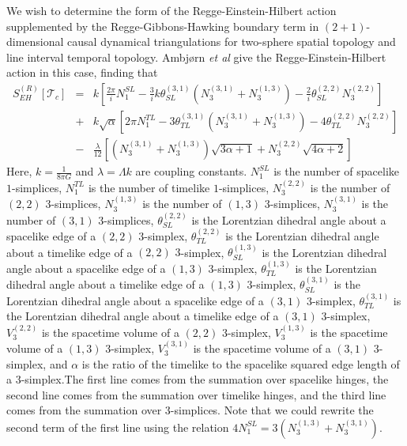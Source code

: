 \documentclass{article}
\begin{document}
We wish to determine the form of the Regge-Einstein-Hilbert action
supplemented by the Regge-Gibbons-Hawking boundary term in
$(2+1)$-dimensional causal dynamical triangulations for two-sphere
spatial topology and line interval temporal topology. Ambj\o rn
\emph{et al} \cite{DynamicallyTriangulating} give the Regge-Einstein-Hilbert action in this case,
finding that
\begin{eqnarray}
S_{EH}^{(R)}[\mathcal{T}_{c}]&=& k\left[\frac{2\pi}{i}N_1^{SL} - \frac{3}{i}k\theta_{SL}^{(3,1)}\left(N_3^{(3,1)} + N_3^{(1,3)}\right) - \frac{2}{i}\theta_{SL}^{(2,2)}N_3^{(2,2)}\right]\\
&+& k\sqrt{\alpha}\left[2\pi N_1^{TL} - 3\theta_{TL}^{(3,1)}(N_3^{(3,1)}+N_3^{(1,3)})-4\theta_{TL}^{(2,2)}N_3^{(2,2)}\right]\nonumber\\
&-& \frac{\lambda}{12}\left[(N_3^{(3,1)}+N_3^{(1,3)})\sqrt{3\alpha+1} + N_3^{(2,2)}\sqrt{4\alpha+2}\right]\nonumber
\end{eqnarray}
Here, $k = \frac{1}{8\pi G}$ and $\lambda = \Lambda k$ are coupling
constants. $N_{1}^{SL}$ is the number of spacelike $1$-simplices,
$N_{1}^{TL}$ is the number of timelike $1$-simplices, $N_{3}^{(2,2)}$
is the number of $(2,2)$ $3$-simplices, $N_{3}^{(1,3)}$ is the number
of $(1,3)$ $3$-simplices, $N_{3}^{(3,1)}$ is the number of $(3,1)$
$3$-simplices, $\theta_{SL}^{(2,2)}$ is the Lorentzian dihedral angle
about a spacelike edge of a $(2,2)$ $3$-simplex, $\theta_{TL}^{(2,2)}$
is the Lorentzian dihedral angle about a timelike edge of a $(2,2)$
$3$-simplex, $\theta_{SL}^{(1,3)}$ is the Lorentzian dihedral angle
about a spacelike edge of a $(1,3)$ $3$-simplex, $\theta_{TL}^{(1,3)}$
is the Lorentzian dihedral angle about a timelike edge of a $(1,3)$
$3$-simplex, $\theta_{SL}^{(3,1)}$ is the Lorentzian dihedral angle
about a spacelike edge of a $(3,1)$ $3$-simplex, $\theta_{TL}^{(3,1)}$
is the Lorentzian dihedral angle about a timelike edge of a $(3,1)$
$3$-simplex, $V_{3}^{(2,2)}$ is the spacetime volume of a $(2,2)$
$3$-simplex, $V_{3}^{(1,3)}$ is the spacetime volume of a $(1,3)$
$3$-simplex, $V_{3}^{(3,1)}$ is the spacetime volume of a $(3,1)$
$3$-simplex, and $\alpha$ is the ratio of the timelike to the
spacelike squared edge length of a $3$-simplex.The first line comes
from the summation over spacelike hinges, the second line comes from
the summation over timelike hinges, and the third line comes from the
summation over $3$-simplices. Note that we could rewrite the second
term of the first line using the relation
$4N_{1}^{SL}=3\left(N_{3}^{(1,3)}+N_{3}^{(3,1)}\right)$.
\end{document}
